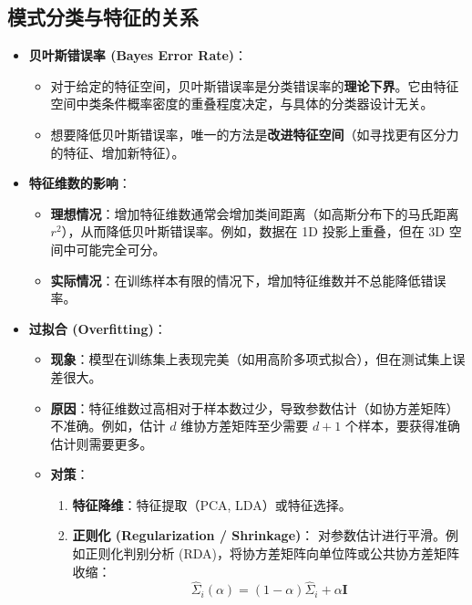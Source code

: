 \documentclass[a4paper, 11pt]{ctexart}
\begin{document}
\subsection{模式分类与特征的关系}
\begin{itemize}
    \item \textbf{贝叶斯错误率 (Bayes Error Rate)}：
    \begin{itemize}
        \item 对于给定的特征空间，贝叶斯错误率是分类错误率的\textbf{理论下界}。它由特征空间中类条件概率密度的重叠程度决定，与具体的分类器设计无关。
        \item 想要降低贝叶斯错误率，唯一的方法是\textbf{改进特征空间}（如寻找更有区分力的特征、增加新特征）。
    \end{itemize}
    
    \item \textbf{特征维数的影响}：
    \begin{itemize}
        \item \textbf{理想情况}：增加特征维数通常会增加类间距离（如高斯分布下的马氏距离 $r^2$），从而降低贝叶斯错误率。例如，数据在 1D 投影上重叠，但在 3D 空间中可能完全可分。
        \item \textbf{实际情况}：在训练样本有限的情况下，增加特征维数并不总能降低错误率。
    \end{itemize}

    \item \textbf{过拟合 (Overfitting)}：
    \begin{itemize}
        \item \textbf{现象}：模型在训练集上表现完美（如用高阶多项式拟合），但在测试集上误差很大。
        \item \textbf{原因}：特征维数过高相对于样本数过少，导致参数估计（如协方差矩阵）不准确。例如，估计 $d$ 维协方差矩阵至少需要 $d+1$ 个样本，要获得准确估计则需要更多。
        \item \textbf{对策}：
        \begin{enumerate}
            \item \textbf{特征降维}：特征提取（PCA, LDA）或特征选择。
            \item \textbf{正则化 (Regularization / Shrinkage)}：
            对参数估计进行平滑。例如正则化判别分析 (RDA)，将协方差矩阵向单位阵或公共协方差矩阵收缩：
            \begin{equation}
                \hat{\Sigma}_i(\alpha) = (1-\alpha)\hat{\Sigma}_i + \alpha \mathbf{I}
            \end{equation}
        \end{enumerate}
    \end{itemize}
\end{itemize}
\newpage
\end{document}
